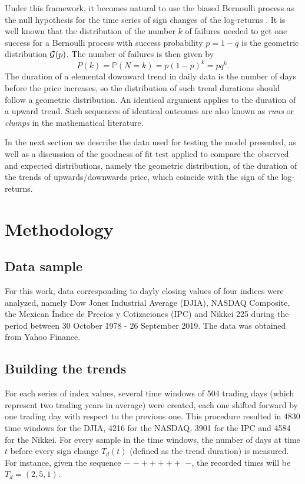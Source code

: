 \documentclass[a4paper]{jpconf}
\begin{document}
Under this framework, it becomes natural to use the biased Bernoulli process as the null hypothesis for the time series of sign changes of the log-returns \cite{scalasold}. It is well known that the distribution of the number $k$ of failures needed to get one success for a Bernoulli process with success probability $p=1-q$ is the geometric distribution ${\cal{G}}(p)$. The number of failures is then given by 
\begin{equation}
P(k)=\mathbb{P}(N=k) = p(1 - p)^{k} = pq^{k}.
\end{equation}
The duration of a elemental downward trend in daily data is the number of days before the price increases, so the distribution of such trend durations should follow a geometric distribution. An identical argument applies to the duration of a upward trend. Such sequences of identical outcomes are also known as {\em runs} or {\em clumps} in the mathematical literature.

In the next section we describe the data used for testing the model presented, as well as a discussion of the goodness of fit test applied to compare the observed and expected distributions, namely the  geometric distribution, of the duration of the trends of upwards/downwards price, which coincide with the sign of the log-returns.

\section{Methodology}
\label{methodology}
\subsection{Data sample}
For this work, data corresponding to dayly closing values of four indices were analyzed, namely Dow Jones Industrial Average (DJIA), NASDAQ Composite, the Mexican \'Indice de Precios y Cotizaciones (IPC) and Nikkei 225 during the period between 30 October 1978 - 26 September 2019. The data was obtained from Yahoo Finance.

\subsection{Building the trends}

For each series of index values, several time windows of 504 trading days (which represent two trading years in average) were created, each one shifted forward by one trading day with respect to the previous one. This procedure resulted in 4830 time windows for the DJIA, 4216 for the NASDAQ, 3901 for the IPC and 4584 for the Nikkei. For every sample in the time windows, the number of days at time $t$ before every sign change $T_d(t)$ (defined as the trend duration) is measured. For instance, given the sequence $-$ $ - + + + + + $ $-$, the recorded times will be $T_d = (2,5,1)$.
\end{document}
